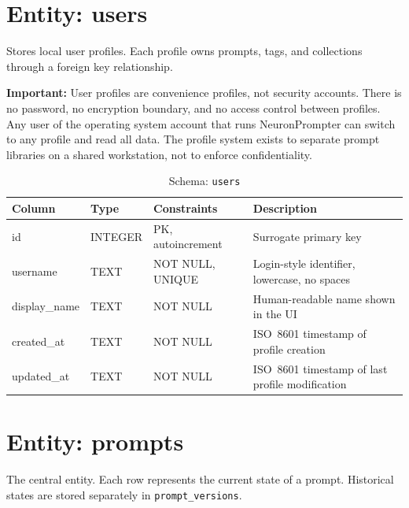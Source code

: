 \documentclass[a4paper, 11pt, oneside]{report}
\begin{document}
\section{Entity: users}
\label{sec:entity-users}

Stores local user profiles.  Each profile owns prompts, tags, and
collections through a foreign key relationship.

\textbf{Important:} User profiles are convenience profiles, not security
accounts.  There is no password, no encryption boundary, and no access
control between profiles.  Any user of the operating system account that
runs NeuronPrompter can switch to any profile and read all data.  The
profile system exists to separate prompt libraries on a shared workstation,
not to enforce confidentiality.

\begin{table}[H]
  \centering
  \caption{Schema: \texttt{users}}
  \label{tab:schema-users}
  \begin{tabularx}{\textwidth}{l l l X}
    \toprule
    \textbf{Column} & \textbf{Type} & \textbf{Constraints} & \textbf{Description} \\
    \midrule
    id            & INTEGER & PK, autoincrement & Surrogate primary key \\
    username      & TEXT    & NOT NULL, UNIQUE   & Login-style identifier, lowercase, no spaces \\
    display\_name & TEXT    & NOT NULL           & Human-readable name shown in the UI \\
    created\_at   & TEXT    & NOT NULL           & ISO~8601 timestamp of profile creation \\
    updated\_at   & TEXT    & NOT NULL           & ISO~8601 timestamp of last profile modification \\
    \bottomrule
  \end{tabularx}
\end{table}

\section{Entity: prompts}
\label{sec:entity-prompts}

The central entity.  Each row represents the current state of a prompt.
Historical states are stored separately in \texttt{prompt\_versions}.
\end{document}
